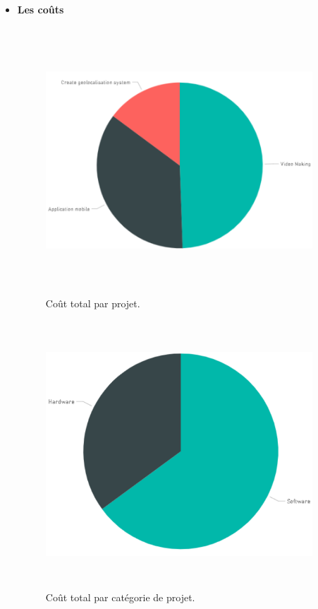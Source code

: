 \begin{itemize}

\item{ \textbf{Les  co\^{u}ts}  }

\FloatBarrier
\begin{figure}[H]
\center
\includegraphics[width=10cm,height=10cm]{./figures/rpb1.png}
\caption{Co\^{u}t total par projet.}

\end{figure}
\FloatBarrier

\FloatBarrier
\begin{figure}[H]
\center
\includegraphics[width=10cm,height=10cm]{./figures/rpb2.png}
\caption{Co\^{u}t total par catégorie de projet.}


\end{figure}
\end{itemize}
